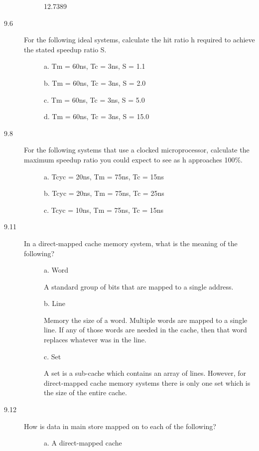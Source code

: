 \documentclass[letterpaper,10pt,titlepage]{article}
\begin{document}
\begin{description}
\begin{description}
        12.7389
    \end{description}
    \item[9.6] For the following ideal systems, calculate the hit ratio h required to achieve the stated speedup ratio S.
    \begin{description}
        \item[] a. Tm = 60ns, Tc = 3ns, S = 1.1
        \item[] b. Tm = 60ns, Tc = 3ns, S = 2.0
        \item[] c. Tm = 60ns, Tc = 3ns, S = 5.0
        \item[] d. Tm = 60ns, Tc = 3ns, S = 15.0
    \end{description}
    \item[9.8] For the following systems that use a clocked microprocessor, calculate the maximum speedup ratio you could expect to see as h approaches 100\%.
    \begin{description}
        \item[] a. Tcyc = 20ns, Tm = 75ns, Tc = 15ns
        \item[] b. Tcyc = 20ns, Tm = 75ns, Tc = 25ns
        \item[] c. Tcyc = 10ns, Tm = 75ns, Tc = 15ns
    \end{description}
    \item[9.11] In a direct-mapped cache memory system, what is the meaning of the following?
    \begin{description}
        \item[] a. Word
        	
        A standard group of bits that are mapped to a single address.
        \item[] b. Line
        
        Memory the size of a word. Multiple words are mapped to a single line. If any of those words are needed in the cache, then that word replaces whatever was in the line.
        \item[] c. Set
        
        A set is a sub-cache which contains an array of lines. However, for direct-mapped cache memory systems there is only one set which is the size of the entire cache.
    \end{description}
    \item[9.12] How is data in main store mapped on to each of the following?
    \begin{description}
        \item[] a. A direct-mapped cache
        

\end{description}
\end{description}
\end{document}
